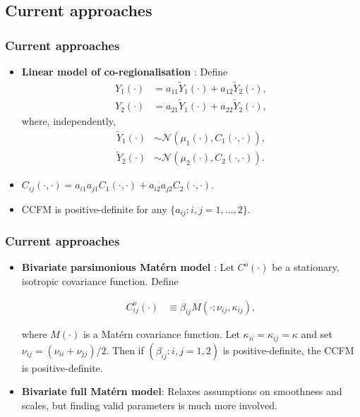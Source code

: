 \documentclass{beamer}
\newcommand{\Yt}{\widetilde{Y}}
\begin{document}

\subsection{Current approaches}

\begin{frame}
\frametitle{Current approaches}

\begin{itemize}

\item {\bf Linear model of co-regionalisation} \citep[LMC,][]{Wackernagel1995}: Define
\begin{align}
    Y_1(\cdot) &= a_{11}\Yt_1(\cdot) + a_{12}\Yt_2(\cdot),\\
    Y_2(\cdot) &= a_{21}\Yt_1(\cdot) + a_{22}\Yt_2(\cdot),
\end{align}
where, independently,
\begin{align}
    \Yt_1(\cdot) &\sim \mathcal{N}(\mu_1(\cdot), C_{1}(\cdot,\cdot)),\\
    \Yt_2(\cdot) &\sim \mathcal{N}(\mu_2(\cdot), C_{2}(\cdot,\cdot)).
\end{align}

\item $C_{ij}(\cdot,\cdot) = a_{i1}a_{j1}C_{1}(\cdot,\cdot) + a_{i2}a_{j2}C_{2}(\cdot,\cdot)$.
\item CCFM is positive-definite for any $\{a_{ij}: i,j = 1,\dots,2\}$. 
\end{itemize}
\end{frame}


\begin{frame}
\frametitle{Current approaches}

\begin{itemize}
\item {\bf Bivariate parsimonious Matérn model} \citep{Gneitingetal2010}: Let $C^o(\cdot)$ be a stationary, isotropic covariance function. Define
  
\begin{align}
    C_{ij}^o(\cdot) & \equiv \beta_{ij}M(\cdot; \nu_{ij}, \kappa_{ij}),
\end{align}

where $M(\cdot)$ is a Matérn covariance function. Let $\kappa_{ii} = \kappa_{ij} = \kappa$ and set $\nu_{ij} = (\nu_{ii} + \nu_{jj})/2$. Then if  $(\beta_{ij}:i,j = 1,2)$ is positive-definite, the CCFM is positive-definite.\vfill
  
\item {\bf Bivariate full Matérn model}:  Relaxes assumptions on smoothness and scales, but finding valid parameters is much more involved.\vfill
\end{itemize}

\end{frame}
\end{document}
